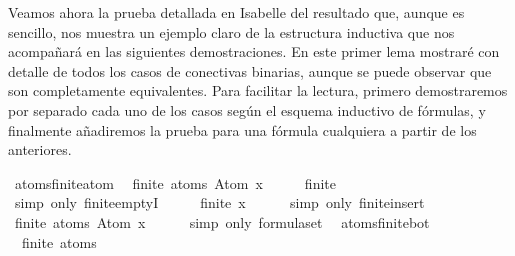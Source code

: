 \begin{isabellebody}
\begin{isamarkuptext}
  Veamos ahora la prueba detallada en Isabelle del resultado que, aunque 
  es sencillo, nos muestra un ejemplo claro de la estructura inductiva 
  que nos acompañará en las siguientes demostraciones. En este primer 
  lema mostraré con detalle de todos los casos de conectivas binarias, 
  aunque se puede observar que son completamente equivalentes. Para 
  facilitar la lectura, primero demostraremos por separado cada uno de 
  los casos según el esquema inductivo de fórmulas, y finalmente 
  añadiremos la prueba para una fórmula cualquiera a partir de los 
  anteriores.%
\end{isamarkuptext}\isamarkuptrue%
\isamarkupfalse%
\ atoms{\isacharunderscore}finite{\isacharunderscore}atom{\isacharcolon}\isanewline
\ \ {\isachardoublequoteopen}finite\ {\isacharparenleft}atoms\ {\isacharparenleft}Atom\ x{\isacharparenright}{\isacharparenright}{\isachardoublequoteclose}\isanewline
%
\isadelimproof
%
\endisadelimproof
%
\isatagproof
{}\isamarkupfalse%
\ {\isacharminus}\isanewline
\ \ \isamarkupfalse%
\ {\isachardoublequoteopen}finite\ {\isasymemptyset}{\isachardoublequoteclose}\isanewline
\ \ \ \ \isamarkupfalse%
\ {\isacharparenleft}simp\ only{\isacharcolon}\ finite{\isachardot}emptyI{\isacharparenright}\isanewline
\ \ \isamarkupfalse%
\ \isamarkupfalse%
\ {\isachardoublequoteopen}finite\ {\isacharbraceleft}x{\isacharbraceright}{\isachardoublequoteclose}\isanewline
\ \ \ \ \isamarkupfalse%
\ {\isacharparenleft}simp\ only{\isacharcolon}\ finite{\isacharunderscore}insert{\isacharparenright}\isanewline
\ \ \isamarkupfalse%
\ \isamarkupfalse%
\ {\isachardoublequoteopen}finite\ {\isacharparenleft}atoms\ {\isacharparenleft}Atom\ x{\isacharparenright}{\isacharparenright}{\isachardoublequoteclose}\isanewline
\ \ \ \ \isamarkupfalse%
\ {\isacharparenleft}simp\ only{\isacharcolon}\ formula{\isachardot}set{\isacharparenleft}{}{\isacharparenright}{\isacharparenright}\ \isanewline
{}\isamarkupfalse%
%
\endisatagproof
{\isafoldproof}%
%
\isadelimproof
\isanewline
%
\endisadelimproof
\isanewline
{}\isamarkupfalse%
\ atoms{\isacharunderscore}finite{\isacharunderscore}bot{\isacharcolon}\isanewline
\ \ {\isachardoublequoteopen}finite\ {\isacharparenleft}atoms\ {\isasymbottom}{\isacharparenright}{\isachardoublequoteclose}\isanewline
%
\isadelimproof
%
\endisadelimproof
%
\isatagproof
{}\isamarkupfalse%
\ {\isacharminus}\isanewline

\end{isabellebody}

